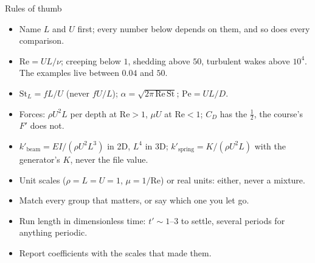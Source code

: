 \documentclass[aspectratio=169,11pt]{beamer}
\begin{document}
\begin{frame}{Rules of thumb}
\label{fr:thumb}
\small
\begin{itemize}
  \item Name $L$ and $U$ first; every number below depends on them, and so does every comparison.
  \item $\mathrm{Re} = UL/\nu$; creeping below $1$, shedding above $50$, turbulent wakes above $10^4$. The examples live between $0.04$ and $50$.
  \item $\mathrm{St}_L = fL/U$ (never $fU/L$); $\alpha = \sqrt{2\pi\,\mathrm{Re}\,\mathrm{St}}$; $\mathrm{Pe} = UL/D$.
  \item Forces: $\rho U^2 L$ per depth at $\mathrm{Re} > 1$, $\mu U$ at $\mathrm{Re} < 1$; $C_D$ has the $\frac12$, the course's $F'$ does not.
  \item $k'_{\mathrm{beam}} = EI/(\rho U^2 L^3)$ in 2D, $L^4$ in 3D; $k'_{\mathrm{spring}} = K/(\rho U^2 L)$ with the generator's $K$, never the file value.
  \item Unit scales ($\rho = L = U = 1$, $\mu = 1/\mathrm{Re}$) or real units: either, never a mixture.
  \item Match every group that matters, or say which one you let go.
  \item Run length in dimensionless time: $t' \sim 1$--$3$ to settle, several periods for anything periodic.
  \item Report coefficients with the scales that made them.
\end{itemize}
\end{frame}
\end{document}
